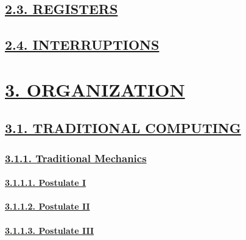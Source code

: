 \documentclass[
]{article}
\begin{document}
\hypertarget{registers}{%
\subsection{\texorpdfstring{\protect\hyperlink{registers-1}{2.3.
REGISTERS}}{2.3. REGISTERS}}\label{registers}}

\hypertarget{interruptions}{%
\subsection{\texorpdfstring{\protect\hyperlink{interruptions-1}{2.4.
INTERRUPTIONS}}{2.4. INTERRUPTIONS}}\label{interruptions}}

\hypertarget{organization}{%
\section{\texorpdfstring{\protect\hyperlink{organization-1}{3.
ORGANIZATION}}{3. ORGANIZATION}}\label{organization}}

\hypertarget{traditional-computing}{%
\subsection{\texorpdfstring{\protect\hyperlink{traditional-computing-1}{3.1.
TRADITIONAL
COMPUTING}}{3.1. TRADITIONAL COMPUTING}}\label{traditional-computing}}

\hypertarget{traditional-mechanics}{%
\subsubsection{\texorpdfstring{\protect\hyperlink{traditional-mechanics-1}{3.1.1.
Traditional
Mechanics}}{3.1.1. Traditional Mechanics}}\label{traditional-mechanics}}

\hypertarget{postulate-i}{%
\paragraph{\texorpdfstring{\protect\hyperlink{postulate-i-1}{3.1.1.1.
Postulate I}}{3.1.1.1. Postulate I}}\label{postulate-i}}

\hypertarget{postulate-ii}{%
\paragraph{\texorpdfstring{\protect\hyperlink{postulate-ii-1}{3.1.1.2.
Postulate II}}{3.1.1.2. Postulate II}}\label{postulate-ii}}

\hypertarget{postulate-iii}{%
\paragraph{\texorpdfstring{\protect\hyperlink{postulate-iii-1}{3.1.1.3.
Postulate III}}{3.1.1.3. Postulate III}}\label{postulate-iii}}
\end{document}
